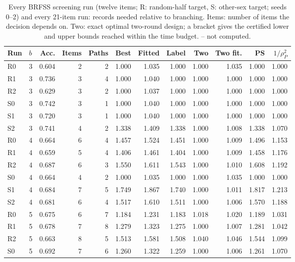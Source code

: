 \begin{table}[h]
\centering
\caption{Every BRFSS screening run (twelve items; R: random-half target, S: other-sex target; seeds 0--2) and every 21-item run: records needed relative to branching. Items: number of items the decision depends on. Two: exact optimal two-round design; a bracket gives the certified lower and upper bounds reached within the time budget. -- not computed.}
\label{tab:runs}
\scriptsize
\setlength{\tabcolsep}{3.2pt}
\begin{tabular}{llrrrrrrrrrr}
\toprule
Run & $b$ & Acc. & Items & Paths & Best & Fitted & Label & Two & Two fit. & PS & $1/\rho_P^2$ \\
\midrule
R0 & 3 & 0.604 & 2 & 2 & 1.000 & 1.035 & 1.000 & 1.000 & 1.035 & 1.000 & 1.000 \\
R1 & 3 & 0.736 & 3 & 4 & 1.000 & 1.040 & 1.000 & 1.000 & 1.000 & 1.000 & 1.000 \\
R2 & 3 & 0.629 & 3 & 2 & 1.000 & 1.037 & 1.000 & 1.000 & 1.000 & 1.000 & 1.000 \\
S0 & 3 & 0.742 & 3 & 1 & 1.000 & 1.040 & 1.000 & 1.000 & 1.000 & 1.000 & 1.000 \\
S1 & 3 & 0.720 & 3 & 1 & 1.000 & 1.040 & 1.000 & 1.000 & 1.000 & 1.000 & 1.000 \\
S2 & 3 & 0.741 & 4 & 2 & 1.338 & 1.409 & 1.338 & 1.000 & 1.008 & 1.338 & 1.070 \\
R0 & 4 & 0.664 & 6 & 4 & 1.457 & 1.524 & 1.451 & 1.000 & 1.009 & 1.496 & 1.153 \\
R1 & 4 & 0.659 & 5 & 4 & 1.406 & 1.461 & 1.404 & 1.000 & 1.009 & 1.458 & 1.176 \\
R2 & 4 & 0.687 & 6 & 3 & 1.550 & 1.611 & 1.543 & 1.000 & 1.010 & 1.608 & 1.192 \\
S0 & 4 & 0.664 & 4 & 2 & 1.000 & 1.035 & 1.000 & 1.000 & 1.035 & 1.000 & 1.000 \\
S1 & 4 & 0.684 & 7 & 5 & 1.749 & 1.867 & 1.740 & 1.000 & 1.011 & 1.817 & 1.213 \\
S2 & 4 & 0.681 & 6 & 4 & 1.517 & 1.610 & 1.511 & 1.000 & 1.006 & 1.570 & 1.188 \\
R0 & 5 & 0.675 & 6 & 7 & 1.184 & 1.231 & 1.183 & 1.018 & 1.020 & 1.189 & 1.031 \\
R1 & 5 & 0.678 & 7 & 8 & 1.279 & 1.323 & 1.275 & 1.000 & 1.007 & 1.281 & 1.042 \\
R2 & 5 & 0.663 & 8 & 5 & 1.513 & 1.581 & 1.508 & 1.040 & 1.046 & 1.544 & 1.099 \\
S0 & 5 & 0.692 & 7 & 6 & 1.260 & 1.322 & 1.259 & 1.000 & 1.006 & 1.261 & 1.070 \\

\end{tabular}
\end{table}
